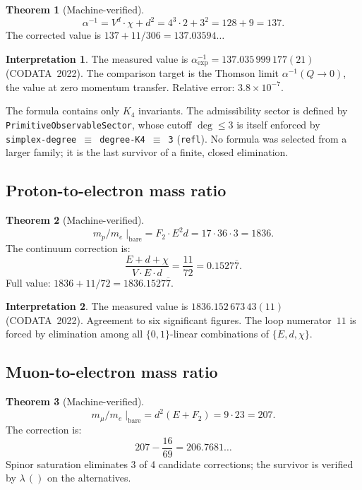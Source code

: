 \documentclass[11pt,a4paper]{article}
\theoremstyle{definition}
\newtheorem{theorem}{Theorem}[section]
\newtheorem*{interpretation}{Interpretation}
\begin{document}
\begin{theorem}[Machine-verified]
\[
  \alpha^{-1} = V^d \cdot \chi + d^2 = 4^3 \cdot 2 + 3^2 = 128 + 9 = 137.
\]
The corrected value is $137 + 11/306 = 137.03594\ldots$
\end{theorem}

\begin{interpretation}
The measured value is $\alpha^{-1}_{\mathrm{exp}} = 137.035\,999\,177(21)$
(CODATA~2022).  The comparison target is the Thomson limit
$\alpha^{-1}(Q \to 0)$, the value at zero momentum transfer.
Relative error: $3.8 \times 10^{-7}$.

The formula contains only $K_4$ invariants.  The admissibility sector is
defined by \texttt{PrimitiveObservableSector}, whose cutoff $\deg \le 3$ is
itself enforced by \texttt{simplex-degree $\equiv$ degree-K4 $\equiv$ 3}
(\texttt{refl}).  No formula was selected from a larger family; it is the
last survivor of a finite, closed elimination.
\end{interpretation}

\subsection{Proton-to-electron mass ratio}

\begin{theorem}[Machine-verified]
\[
  m_p / m_e \;\big|_{\mathrm{bare}} = F_2 \cdot E^2 d = 17 \cdot 36 \cdot 3 = 1836.
\]
The continuum correction is:
\[
  \frac{E + d + \chi}{V \cdot E \cdot d} = \frac{11}{72} = 0.1527\overline{7}.
\]
Full value: $1836 + 11/72 = 1836.1527\overline{7}$.
\end{theorem}

\begin{interpretation}
The measured value is $1836.152\,673\,43(11)$ (CODATA~2022).
Agreement to six significant figures.  The loop numerator~$11$ is forced
by elimination among all $\{0,1\}$-linear combinations of $\{E, d, \chi\}$.
\end{interpretation}

\subsection{Muon-to-electron mass ratio}

\begin{theorem}[Machine-verified]
\[
  m_\mu / m_e \;\big|_{\mathrm{bare}} = d^2(E + F_2) = 9 \cdot 23 = 207.
\]
The correction is:
\[
  207 - \frac{16}{69} = 206.7681\ldots
\]
Spinor saturation eliminates 3 of 4 candidate corrections;
the survivor is verified by $\lambda\,()$ on the alternatives.
\end{theorem}
\end{document}
